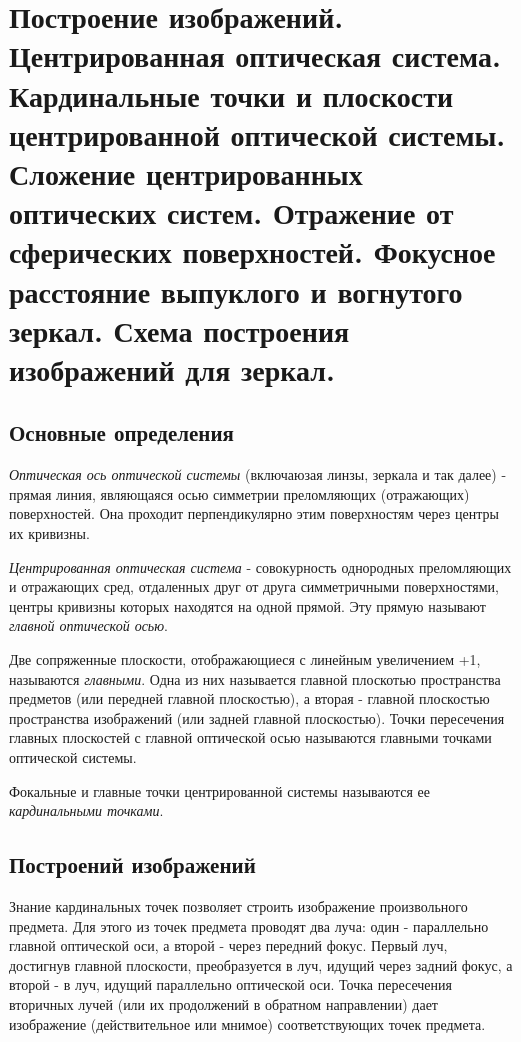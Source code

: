 
\section{Построение изображений. Центрированная оптическая система. Кардинальные точки и плоскости центрированной оптической системы. Сложение центрированных оптических систем. Отражение от сферических поверхностей. Фокусное расстояние выпуклого и вогнутого зеркал. Схема построения изображений для зеркал.}



\subsection{Основные определения}

\textit{Оптическая ось оптической системы} (включаюзая линзы, зеркала и так далее) - прямая линия, являющаяся осью симметрии преломляющих (отражающих) поверхностей. Она проходит перпендикулярно этим поверхностям через центры их кривизны.

\medskip

\textit{Центрированная оптическая система} - совокурность однородных преломляющих и отражающих сред, отдаленных друг от друга симметричными поверхностями, центры кривизны которых находятся на одной прямой. Эту прямую называют \textit{главной оптической осью}.

\medskip

Две сопряженные плоскости, отображающиеся с линейным увеличением +1, называются \textit{главными}. Одна из них называется главной плоскотью пространства предметов (или передней главной плоскостью), а вторая - главной плоскостью пространства изображений (или задней главной плоскостью).  Точки пересечения главных плоскостей с главной оптической осью называются главными точками оптической системы.

Фокальные и главные точки центрированной системы называются ее \textit{кардинальными точками}.

\subsection{Построений изображений}

Знание кардинальных точек позволяет строить изображение произвольного предмета. Для этого из точек предмета проводят два луча: один - параллельно главной оптической оси, а второй - через передний фокус. Первый луч, достигнув главной плоскости, преобразуется в луч, идущий через задний фокус, а второй - в луч, идущий параллельно оптической оси. Точка пересечения вторичных лучей (или их продолжений в обратном направлении) дает изображение (действительное или мнимое) соответствующих точек предмета.

